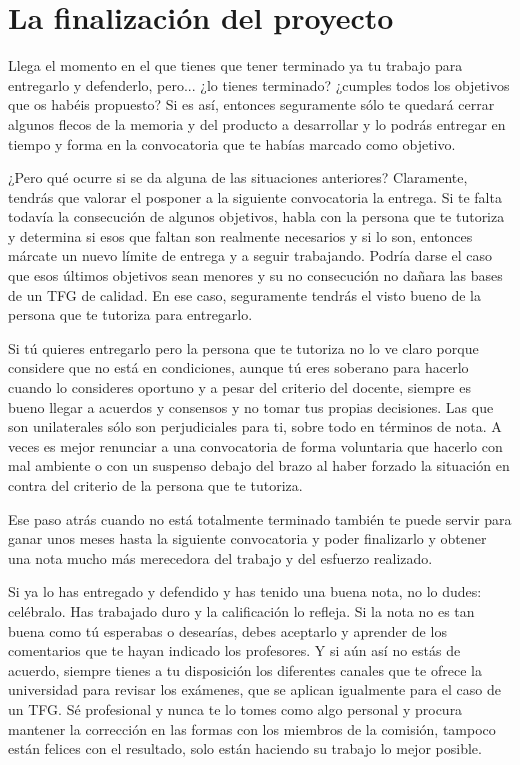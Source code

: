 {%
\section{La finalización del proyecto}

Llega el momento en el que tienes que tener terminado ya tu trabajo para entregarlo y defenderlo, pero... ¿lo tienes terminado? ¿cumples todos los objetivos que os habéis propuesto? Si es así, entonces seguramente sólo te quedará cerrar algunos flecos de la memoria y del producto a desarrollar y lo podrás entregar en tiempo y forma en la convocatoria que te habías marcado como objetivo.

¿Pero qué ocurre si se da alguna de las situaciones anteriores? Claramente, tendrás que valorar el posponer a la siguiente convocatoria la entrega. Si te falta todavía la consecución de algunos objetivos, habla con la persona que te tutoriza y determina si esos que faltan son realmente necesarios y si lo son, entonces márcate un nuevo límite de entrega y a seguir trabajando. Podría darse el caso que esos últimos objetivos sean menores y su no consecución no dañara las bases de un TFG de calidad. En ese caso, seguramente tendrás el visto bueno de la persona que te tutoriza para entregarlo. 

Si tú quieres entregarlo pero la persona que te tutoriza no lo ve claro porque considere que no está en condiciones, aunque tú eres soberano para hacerlo cuando lo consideres oportuno y a pesar del criterio del docente, siempre es bueno llegar a acuerdos y consensos y no tomar tus propias decisiones. Las que son unilaterales sólo son perjudiciales para ti, sobre todo en términos de nota. A veces es mejor renunciar a una convocatoria de forma voluntaria que hacerlo con mal ambiente o con un suspenso debajo del brazo al haber forzado la situación en contra del criterio de la persona que te tutoriza. 

Ese paso atrás cuando no está totalmente terminado también te puede servir para ganar unos meses hasta la siguiente convocatoria y poder finalizarlo y obtener una nota mucho más merecedora del trabajo y del esfuerzo realizado. 

Si ya lo has entregado y defendido y has tenido una buena nota, no lo dudes: celébralo. Has trabajado duro y la calificación lo refleja. Si la nota no es tan buena como tú esperabas o desearías, debes aceptarlo y aprender de los comentarios que te hayan indicado los profesores.  Y si aún así no estás de acuerdo, siempre tienes a tu disposición los diferentes canales que  te ofrece la universidad para revisar los exámenes, que se aplican igualmente para el caso de un TFG. Sé profesional y nunca te lo tomes como algo personal y procura mantener la corrección en las formas con los miembros de la comisión, tampoco están felices con el resultado, solo están haciendo su trabajo lo mejor posible. 

}
